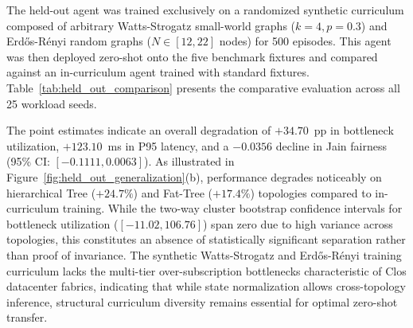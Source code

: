 \documentclass[12pt,a4paper,oneside]{report}
\begin{document}
The held-out agent was trained exclusively on a randomized synthetic curriculum composed of arbitrary Watts-Strogatz small-world graphs ($k=4, p=0.3$) and Erd\H{o}s-R\'enyi random graphs ($N \in [12, 22]$ nodes) for 500 episodes. This agent was then deployed zero-shot onto the five benchmark fixtures and compared against an in-curriculum agent trained with standard fixtures. Table~\ref{tab:held_out_comparison} presents the comparative evaluation across all 25 workload seeds.

\begin{table}[htbp]
\centering
\small
\caption{Zero-Shot Generalization on Strictly Held-Out Benchmark Topologies.}
\label{tab:held_out_comparison}
\end{table}

The point estimates indicate an overall degradation of $+34.70$~pp in bottleneck utilization, $+123.10$~ms in P95 latency, and a $-0.0356$ decline in Jain fairness (95\% CI: $[-0.1111, 0.0063]$). As illustrated in Figure~\ref{fig:held_out_generalization}(b), performance degrades noticeably on hierarchical Tree ($+24.7\%$) and Fat-Tree ($+17.4\%$) topologies compared to in-curriculum training. While the two-way cluster bootstrap confidence intervals for bottleneck utilization ($[-11.02, 106.76]$) span zero due to high variance across topologies, this constitutes an absence of statistically significant separation rather than proof of invariance. The synthetic Watts-Strogatz and Erd\H{o}s-R\'enyi training curriculum lacks the multi-tier over-subscription bottlenecks characteristic of Clos datacenter fabrics, indicating that while state normalization allows cross-topology inference, structural curriculum diversity remains essential for optimal zero-shot transfer.
\end{document}

